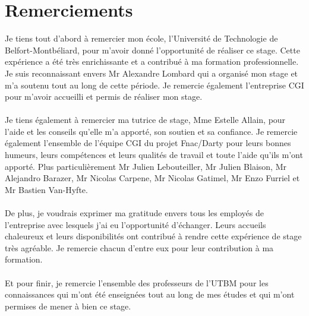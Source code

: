 \documentclass[12pt, a4paper]{report}
\begin{document}
	\arialfont

	\makeutbmfrontcover{}
 
	\chapter*{Remerciements}
	Je tiens tout d'abord à remercier mon école, l'Université de Technologie de Belfort-Montbéliard, pour m'avoir donné l'opportunité de réaliser ce stage. Cette expérience a été très enrichissante et a contribué à ma formation professionnelle. Je suis reconnaissant envers Mr Alexandre Lombard qui a organisé mon stage et m'a soutenu tout au long de cette période. Je remercie également l'entreprise CGI pour m'avoir accueilli et permis de réaliser mon stage.
	\\\\
	Je tiens également à remercier ma tutrice de stage, Mme Estelle Allain, pour l'aide et les conseils qu'elle m'a apporté, son soutien et sa confiance. Je remercie également l'ensemble de l'équipe CGI du projet Fnac/Darty pour leurs bonnes humeurs, leurs compétences et leurs qualités de travail et toute l'aide qu'ils m'ont apporté. Plus particulièrement Mr Julien Lebouteiller, Mr Julien Blaison, Mr Alejandro Barazer, Mr Nicolas Carpene, Mr Nicolas Gatimel, Mr Enzo Furriel et Mr Bastien Van-Hyfte.
	\\\\
	De plus, je voudrais exprimer ma gratitude envers tous les employés de l'entreprise avec lesquels j'ai eu l'opportunité d'échanger. Leurs accueils chaleureux et leurs disponibilités ont contribué à rendre cette expérience de stage très agréable. Je remercie chacun d'entre eux pour leur contribution à ma formation.
	\\\\
	Et pour finir, je remercie l'ensemble des professeurs de l'UTBM pour les connaissances qui m'ont été enseignées tout au long de mes études et qui m'ont permises de mener à bien ce stage.
\end{document}
